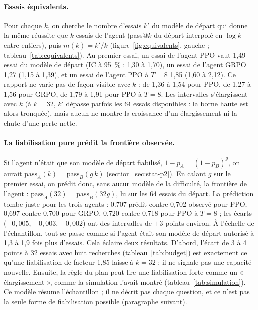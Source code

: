 \paragraph{Essais équivalents.} Pour chaque $k$, on cherche le nombre d'essais $k'$ du modèle de départ qui donne la même réussite que $k$ essais de l'agent (pass@$k$ du départ interpolé en $\log k$ entre entiers), puis $m(k) = k'/k$ (figure~\ref{fig:equivalents}, gauche ; tableau~\ref{tab:equivalents}). Au premier essai, un essai de l'agent PPO vaut 1,49 essai du modèle de départ (IC à 95~\% : 1,30 à 1,70), un essai de l'agent GRPO 1,27 (1,15 à 1,39), et un essai de l'agent PPO à $T = 8$ 1,85 (1,60 à 2,12). Ce rapport ne varie pas de façon visible avec $k$ : de 1,36 à 1,54 pour PPO, de 1,27 à 1,56 pour GRPO, de 1,79 à 1,91 pour PPO à $T = 8$. Les intervalles s'élargissent avec $k$ (à $k = 32$, $k'$ dépasse parfois les 64 essais disponibles : la borne haute est alors tronquée), mais aucun ne montre la croissance d'un élargissement ni la chute d'une perte nette.

\paragraph{La fiabilisation pure prédit la frontière observée.} Si l'agent n'était que son modèle de départ fiabilisé, $1 - p_A = (1 - p_B)^g$, on aurait $\text{pass}_A(k) = \text{pass}_B(g\,k)$ (section~\ref{sec:stat-p2}). En calant $g$ sur le premier essai, on prédit donc, sans aucun modèle de la difficulté, la frontière de l'agent : $\text{pass}_A(32) = \text{pass}_B(32 g)$, lu sur les 64 essais du départ. La prédiction tombe juste pour les trois agents : 0,707 prédit contre 0,702 observé pour PPO, 0,697 contre 0,700 pour GRPO, 0,720 contre 0,718 pour PPO à $T = 8$ ; les écarts ($-0{,}005$, $+0{,}003$, $-0{,}002$) ont des intervalles de $\pm 3$ points environ. À l'échelle de l'échantillon, tout se passe comme si l'agent était son modèle de départ autorisé à 1,3 à 1,9 fois plus d'essais. Cela éclaire deux résultats. D'abord, l'écart de 3 à 4 points à 32 essais avec huit recherches (tableau~\ref{tab:budget}) est exactement ce qu'une fiabilisation de facteur 1,85 laisse à $k = 32$ : il ne signale pas une capacité nouvelle. Ensuite, la règle du plan peut lire une fiabilisation forte comme un « élargissement », comme la simulation l'avait montré (tableau~\ref{tab:simulation}). Ce modèle résume l'échantillon ; il ne décrit pas chaque question, et ce n'est pas la seule forme de fiabilisation possible (paragraphe suivant).

